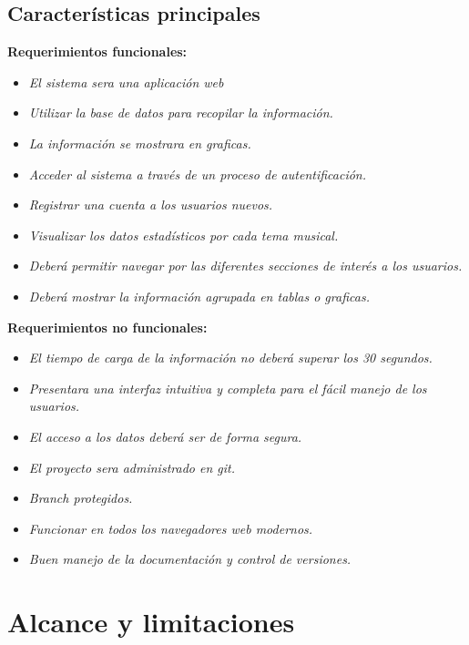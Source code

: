 \documentclass[12pt,a4paper]{book}
\begin{document}
\section{Características principales}
\vspace{0.5 cm}
\textbf {Requerimientos funcionales:}
\vspace{0.5 cm}
\begin{itemize}
\item \textit{El sistema sera una aplicación web}
\item \textit{Utilizar la base de datos para recopilar la información.}
\item \textit{La información se mostrara en graficas.}
\item \textit{Acceder al sistema a través de un proceso de autentificación.}
\item \textit{Registrar una cuenta a los usuarios nuevos.}
\item \textit{Visualizar los datos estadísticos por cada tema musical.}
\item \textit{Deberá permitir navegar por las diferentes secciones de interés a los usuarios.}
\item \textit{Deberá mostrar la información agrupada en tablas o graficas.}
\end{itemize}
\newpage
\textbf {Requerimientos no funcionales:}
\vspace{0.5 cm}
\begin{itemize}
\item \textit{El tiempo de carga de la información no deberá superar los 30 segundos.}
\item \textit{Presentara una interfaz intuitiva y completa para el fácil manejo de los usuarios.}
\item \textit{El acceso a los datos deberá ser de forma segura.}
\item \textit{El proyecto sera administrado en git.}
\item \textit{Branch protegidos.}
\item \textit{Funcionar en todos los navegadores web modernos.}
\item \textit{Buen manejo de la documentación y control de versiones.}
\end{itemize}

\chapter{Alcance y limitaciones}
\end{document}

